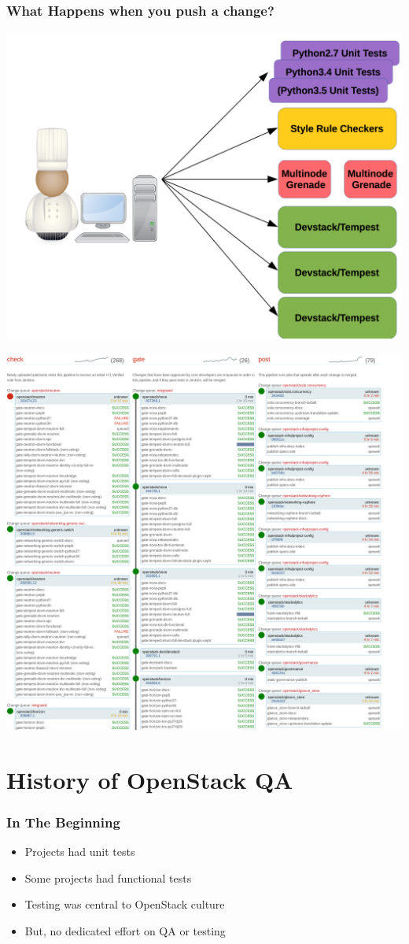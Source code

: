 \documentclass[aspectratio=43,11pt,hyperref={colorlinks=true}]{beamer}
\begin{document}
\begin{frame}
\frametitle{What Happens when you push a change?}
\begin{center}
    \includegraphics[width=.7\textwidth]{jobs.png}
\end{center}
\end{frame}

\begin{frame}
\begin{center}
    \includegraphics[width=.8\textwidth]{ZuulStatus.png}
\end{center}
\end{frame}

\section{History of OpenStack QA}

\begin{frame}
    \frametitle{In The Beginning}
    \begin{itemize}
    \item Projects had unit tests
    \item Some projects had functional tests
    \item Testing was central to OpenStack culture
    \item But, no dedicated effort on QA or testing
    \end{itemize}
\end{frame}
\end{document}
